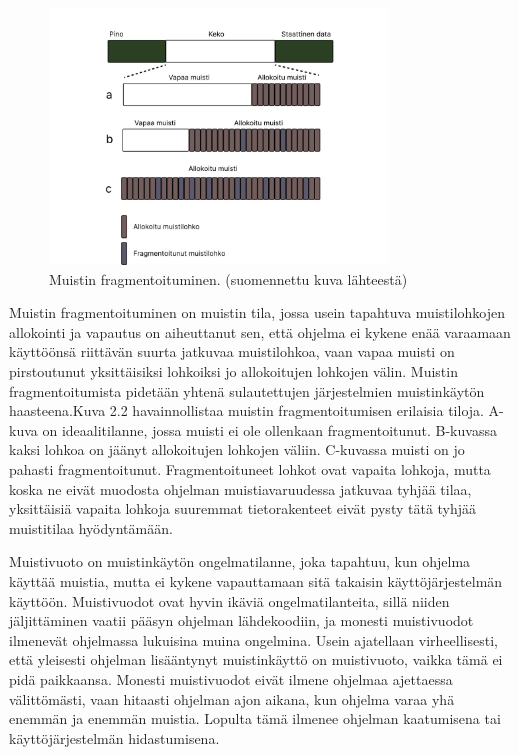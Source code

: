 \begin{figure}[tbh]
{\begin{centering}
\includegraphics[width=0.8\textwidth]{kuvat/fragmentaatio.pdf}
\par\end{centering}}
\caption{Muistin fragmentoituminen.\cite{ammsfmes@2016} (suomennettu kuva lähteestä)}
\end{figure}

Muistin fragmentoituminen on muistin tila, jossa usein tapahtuva muistilohkojen allokointi ja vapautus on aiheuttanut sen, että ohjelma ei kykene enää varaamaan käyttöönsä riittävän suurta jatkuvaa muistilohkoa, vaan vapaa muisti on pirstoutunut yksittäisiksi lohkoiksi jo allokoitujen lohkojen välin. Muistin fragmentoitumista pidetään yhtenä sulautettujen järjestelmien muistinkäytön haasteena.\cite{ammsfmes@2016}Kuva 2.2 havainnollistaa muistin fragmentoitumisen erilaisia tiloja. A-kuva on ideaalitilanne, jossa muisti ei ole ollenkaan fragmentoitunut. B-kuvassa kaksi lohkoa on jäänyt allokoitujen lohkojen väliin. C-kuvassa muisti on jo pahasti fragmentoitunut. Fragmentoituneet lohkot ovat vapaita lohkoja, mutta koska ne eivät muodosta ohjelman muistiavaruudessa jatkuvaa tyhjää tilaa, yksittäisiä vapaita lohkoja suuremmat tietorakenteet eivät pysty tätä tyhjää muistitilaa hyödyntämään.

Muistivuoto on muistinkäytön ongelmatilanne, joka tapahtuu, kun ohjelma käyttää muistia, mutta ei kykene vapauttamaan sitä takaisin käyttöjärjestelmän käyttöön. Muistivuodot ovat hyvin ikäviä ongelmatilanteita, sillä niiden jäljittäminen vaatii pääsyn ohjelman lähdekoodiin, ja monesti muistivuodot ilmenevät ohjelmassa lukuisina muina ongelmina. Usein ajatellaan virheellisesti, että yleisesti ohjelman lisääntynyt muistinkäyttö on muistivuoto, vaikka tämä ei pidä paikkaansa. Monesti muistivuodot eivät ilmene ohjelmaa ajettaessa välittömästi, vaan hitaasti ohjelman ajon aikana, kun ohjelma varaa yhä enemmän ja enemmän muistia. Lopulta tämä ilmenee ohjelman kaatumisena tai käyttöjärjestelmän hidastumisena.\cite{mmic2010}

